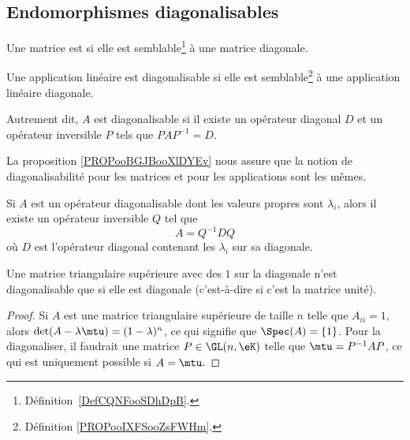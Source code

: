 \subsection{Endomorphismes diagonalisables}

\begin{definition}  \label{DefCNJqsmo}
	Une matrice est  si elle est semblable\footnote{Définition~\ref{DefCQNFooSDhDpB}.} à une matrice diagonale.

	Une application linéaire est diagonalisable si elle est semblable\footnote{Définition \ref{PROPooIXFSooZsFWHm}.} à une application linéaire diagonale.

	Autrement dit, \( A\) est diagonalisable si il existe un opérateur diagonal \( D\) et un opérateur inversible \( P\) tels que \( PAP^{-1}=D\).
\end{definition}

La proposition \ref{PROPooBGJBooXlDYEv} nous assure que la notion de diagonalisabilité pour les matrices et pour les applications sont les mêmes.

\begin{proposition}     \label{PROPooDEETooSOMiGO}
	Si \( A\) est un opérateur diagonalisable dont les valeurs propres sont \( \lambda_i\), alors il existe un opérateur inversible \( Q\) tel que
	\begin{equation}
		A=Q^{-1} DQ
	\end{equation}
	où \( D \) est l'opérateur diagonal contenant les \( \lambda_i\) sur sa diagonale.
\end{proposition}

\begin{lemma}
	Une matrice triangulaire supérieure avec des \( 1\) sur la diagonale n'est diagonalisable que si elle est diagonale (c'est-à-dire si c'est la matrice unité).
\end{lemma}

\begin{proof}
	Si \( A\) est une matrice triangulaire supérieure de taille \( n\) telle que \( A_{ii}=1\), alors \( \det(A-\lambda\mtu)=(1-\lambda)^n\), ce qui signifie que \( \Spec(A)=\{ 1 \}\). Pour la diagonaliser, il faudrait une matrice \( P\in\GL(n,\eK)\) telle que \( \mtu=P^{-1}AP\), ce qui est uniquement possible si \( A=\mtu\).
\end{proof}

